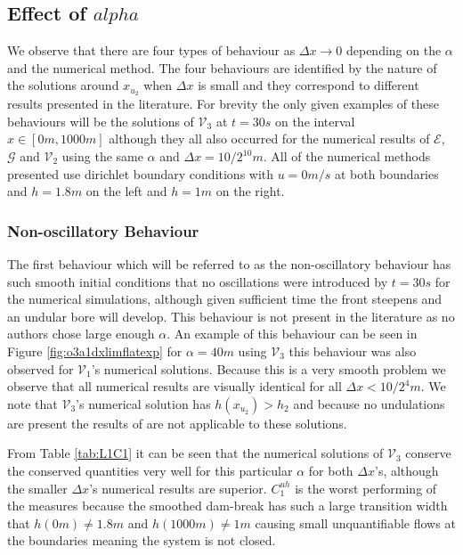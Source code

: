 \documentclass[times]{elsarticle}
\begin{document}
\subsection{Effect of $alpha$}
We observe that there are four types of behaviour as $\Delta x \rightarrow 0$ depending on the $\alpha$ and the numerical method. The four behaviours are identified by the nature of the solutions around $x_{u_2}$ when $\Delta x$ is small and they correspond to different results presented in the literature. For brevity the only given examples of these behaviours will be the solutions of $\mathcal{V}_3$ at $t=30s$ on the interval $x\in[0m,1000m]$ although they all also occurred for the numerical results of $\mathcal{E}$, $\mathcal{G}$ and $\mathcal{V}_2$ using the same $\alpha$ and $\Delta x = 10/2^{10}m$. All of the numerical methods presented use dirichlet boundary conditions with $u = 0m/s$ at both boundaries and $h =1.8m$ on the left and $h =1m$ on the right.

\subsubsection{Non-oscillatory Behaviour}
The first behaviour which will be referred to as the non-oscillatory behaviour has such smooth initial conditions that no oscillations were introduced by $t= 30s$ for the numerical simulations, although given sufficient time the front steepens and an undular bore will develop. This behaviour is not present in the literature as no authors chose large enough $\alpha$. An example of this behaviour can be seen in Figure \ref{fig:o3a1dxlimflatexp} for $\alpha = 40m$ using $\mathcal{V}_3$ this behaviour was also observed for $\mathcal{V}_1$'s numerical solutions. Because this is a very smooth problem we observe that all numerical results are visually identical for all $\Delta x < 10 / 2^4m$. We note that $\mathcal{V}_3$'s numerical solution has $h(x_{u_2}) > h_2$ and because no undulations are present the results of \citet{El-etal-2006} are not applicable to these solutions.   

From Table \ref{tab:L1C1} it can be seen that the numerical solutions of $\mathcal{V}_3$ conserve the conserved quantities very well for this particular $\alpha$ for both $\Delta x$'s, although the smaller $\Delta x$'s numerical results are superior. $C^{uh}_1$ is the worst performing of the measures because the smoothed dam-break has such a large transition width that $h(0m) \neq 1.8m$ and $h(1000m) \neq 1m$ causing small unquantifiable flows at the boundaries meaning the system is not closed. 
\end{document}
